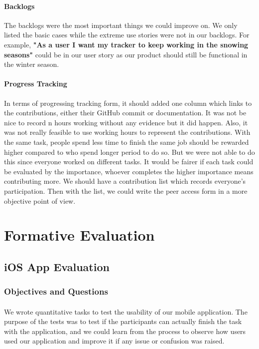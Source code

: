 \documentclass[12pt,a4paper]{article}
\begin{document}
        \paragraph{Backlogs} The backlogs were the most important things we could improve on. We only listed the basic cases while the extreme use stories were not in our backlogs. For example, {\bf "As a user I want my tracker to keep working in the snowing seasons"} could be in our user story as our product should still be functional in the winter season.

        \paragraph{Progress Tracking} In terms of progressing tracking form, it should added one column which links to the contributions, either their GitHub commit or documentation. It was not be nice to record n hours working without any evidence but it did happen. Also, it was not really feasible to use working hours to represent the contributions. With the same task, people spend less time to finish the same job should be rewarded higher compared to who spend longer period to do so. But we were not able to do this since everyone worked on different tasks. It would be fairer if each task could be evaluated by the importance, whoever completes the higher importance means contributing more. We should have a contribution list which records everyone's participation. Then with the list, we could write the peer access form in a more objective point of view.

    \section{Formative Evaluation}
      \label{Chapter:Formative Evaluation}
      \subsection{iOS App Evaluation} 
        
        \subsubsection{Objectives and Questions}
          \paragraph{}
            We wrote quantitative tasks to test the usability of our mobile application\cite{WritingTasks}. The purpose of the tests was to test if the participants can actually finish the task with the application, and we could learn from the process to observe how users used our application and improve it if any issue or confusion was raised. 
\end{document}
